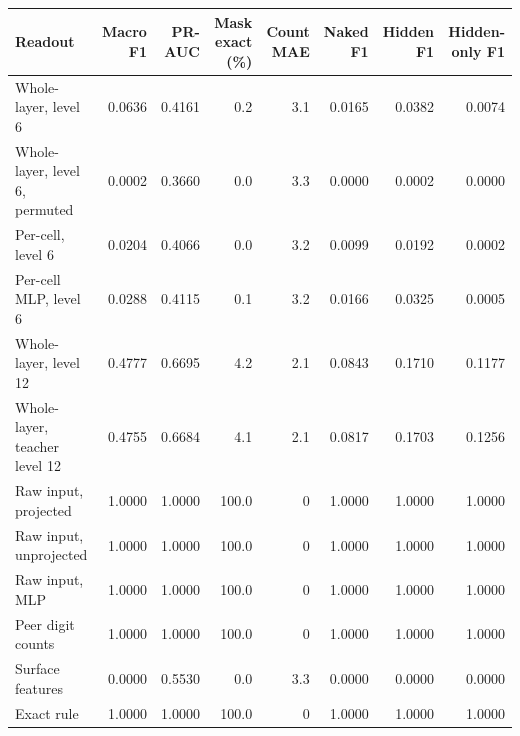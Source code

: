 \begin{tabular}{lrrrrrrr}
\toprule
Readout & Macro F1 & PR-AUC & Mask exact (\%) & Count MAE & Naked F1 & Hidden F1 & Hidden-only F1 \\
\midrule
Whole-layer, level 6 & 0.0636 & 0.4161 & 0.2 & 3.1 & 0.0165 & 0.0382 & 0.0074 \\
Whole-layer, level 6, permuted & 0.0002 & 0.3660 & 0.0 & 3.3 & 0.0000 & 0.0002 & 0.0000 \\
Per-cell, level 6 & 0.0204 & 0.4066 & 0.0 & 3.2 & 0.0099 & 0.0192 & 0.0002 \\
Per-cell MLP, level 6 & 0.0288 & 0.4115 & 0.1 & 3.2 & 0.0166 & 0.0325 & 0.0005 \\
Whole-layer, level 12 & 0.4777 & 0.6695 & 4.2 & 2.1 & 0.0843 & 0.1710 & 0.1177 \\
Whole-layer, teacher level 12 & 0.4755 & 0.6684 & 4.1 & 2.1 & 0.0817 & 0.1703 & 0.1256 \\
Raw input, projected & 1.0000 & 1.0000 & 100.0 & 0 & 1.0000 & 1.0000 & 1.0000 \\
Raw input, unprojected & 1.0000 & 1.0000 & 100.0 & 0 & 1.0000 & 1.0000 & 1.0000 \\
Raw input, MLP & 1.0000 & 1.0000 & 100.0 & 0 & 1.0000 & 1.0000 & 1.0000 \\
Peer digit counts & 1.0000 & 1.0000 & 100.0 & 0 & 1.0000 & 1.0000 & 1.0000 \\
Surface features & 0.0000 & 0.5530 & 0.0 & 3.3 & 0.0000 & 0.0000 & 0.0000 \\
Exact rule & 1.0000 & 1.0000 & 100.0 & 0 & 1.0000 & 1.0000 & 1.0000 \\
\bottomrule
\end{tabular}
